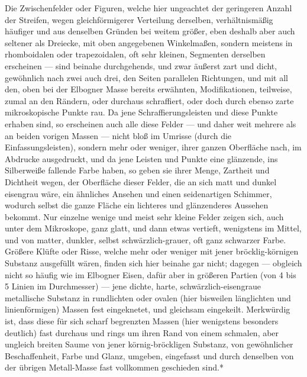 \documentclass[a4paper, 11pt, oneside, german]{article}
\begin{document}
Die Zwischenfelder oder Figuren, welche hier ungeachtet der geringeren Anzahl der Streifen, wegen gleichförmigerer Verteilung derselben, verhältnismäßig häufiger und aus denselben Gründen bei weitem größer, eben deshalb aber auch seltener als Dreiecke, mit oben angegebenen Winkelmaßen, sondern meistens in rhomboidalen oder trapezoidalen, oft sehr kleinen, Segmenten derselben erscheinen --- sind beinahe durchgehends, und zwar äußerst zart und dicht, gewöhnlich nach zwei auch drei, den Seiten parallelen Richtungen, und mit all den, oben bei der Elbogner Masse bereits erwähnten, Modifikationen, teilweise, zumal an den Rändern, oder durchaus schraffiert, oder doch durch ebenso zarte mikroskopische Punkte rau. Da jene Schraffierungsleisten und diese Punkte erhaben sind, so erscheinen auch alle diese Felder --- und daher weit mehrere als an beiden vorigen Massen --- nicht bloß im Umrisse (durch die Einfassungsleisten), sondern mehr oder weniger, ihrer ganzen Oberfläche nach, im Abdrucke ausgedruckt, und da jene Leisten und Punkte eine glänzende, ins Silberweiße fallende Farbe haben, so geben sie ihrer Menge, Zartheit und Dichtheit wegen, der Oberfläche dieser Felder, die an sich matt und dunkel eisengrau wäre, ein ähnliches Ansehen und einen seidenartigen Schimmer, wodurch selbst die ganze Fläche ein lichteres und glänzenderes Aussehen bekommt. Nur einzelne wenige und meist sehr kleine Felder zeigen sich, auch unter dem Mikroskope, ganz glatt, und dann etwas vertieft, wenigstens im Mittel, und von matter, dunkler, selbst schwärzlich-grauer, oft ganz schwarzer Farbe. Größere Klüfte oder Risse, welche mehr oder weniger mit jener bröcklig-körnigen Substanz ausgefüllt wären, finden sich hier beinahe gar nicht; dagegen --- obgleich nicht so häufig wie im Elbogner Eisen, dafür aber in größeren Partien (von 4 bis 5 Linien im Durchmesser) --- jene dichte, harte, schwärzlich-eisengraue metallische Substanz in rundlichten oder ovalen (hier bisweilen länglichten und linienförmigen) Massen fest eingeknetet, und gleichsam eingekeilt. Merkwürdig ist, dass diese für sich scharf begrenzten Massen (hier wenigstens besonders deutlich) fast durchaus und rings um ihren Rand von einem schmalen, aber ungleich breiten Saume von jener körnig-bröckligen Substanz, von gewöhnlicher Beschaffenheit, Farbe und Glanz, umgeben, eingefasst und durch denselben von der übrigen Metall-Masse fast vollkommen geschieden sind.*
\end{document}
